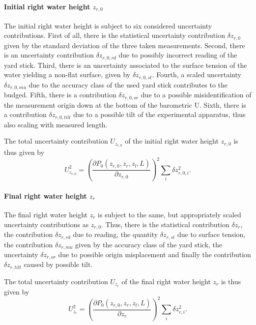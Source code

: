 \documentclass[a4paper,11pt, twocolumn]{article}
\begin{document}
\paragraph{Initial right water height $z_{r,0}$} The initial right water height is subject to six considered uncertainty contributions. First of all, there is the statistical uncertainty contribution $\delta {z_{r,0}}$ given by the standard deviation of the three taken measurements. Second, there is an uncertainty contribution $\delta z_{r,0,rd}$ due to possibly incorrect reading of the yard stick. Third, there is an uncertainty associated to the surface tension of the water yielding a non-flat surface, given by $\delta z_{r,0,st}$. Fourth, a scaled uncertainty $\delta z_{r,0,mu}$ due to the accuracy class of the used yard stick contributes to the budged. Fifth, there is a contribution $\delta z_{r,0,or}$ due to a possible misidentification of the measurement origin down at the bottom of the barometric U. Sixth, there is a contribution $\delta z_{r,0,tilt}$ due to a possible tilt of the experimental apparatus, thus also scaling with measured length. 

The total uncertainty contribution $U_{z_{r,0}}$ of the initial right water height $z_{r,0}$ is thus given by \begin{equation}
	U_{z_{r,0}}^2 = \left(\frac{\partial P_0(z_{r,0}, z_r, z_l, L)}{\partial z_{r,0}}\right)^2\sum_{i}\delta z_{r,0,i}^2.
\end{equation}

\paragraph{Final right water height $z_r$} The final right water height $z_r$ is subject to the same, but appropriately scaled uncertainty contributions as $z_{r,0}$. Thus, there is the statistical contribution $\delta z_r$, the contribution $\delta z_{r,rd}$ due to reading, the quantity $\delta z_{r,st}$ due to surface tension, the contribution $\delta z_{r,mu}$ given by the accuracy class of the yard stick, the uncertainty $\delta z_{r,or}$ due to possible origin misplacement and finally the contribution $\delta z_{r,tilt}$ caused by possible tilt.

The total uncertainty contribution $U_{z_{r}}$ of the final right water height $z_{r}$ is thus given by \begin{equation}
	U_{z_{r}}^2 = \left(\frac{\partial P_0(z_{r,0}, z_r, z_l, L)}{\partial z_{r}}\right)^2\sum_{i}\delta z_{r,i}^2.
\end{equation}
\end{document}
